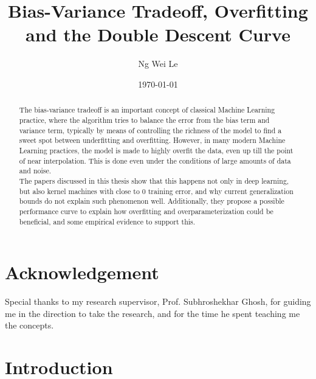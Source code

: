 \documentclass[twoside]{memoir}
\title{Bias-Variance Tradeoff, Overfitting and the Double Descent Curve}
\author{Ng Wei Le}
\date{\today}
\begin{document}
	\frontmatter
	
	
\maketitle

\chapter{Acknowledgement}
Special thanks to my research supervisor, Prof. Subhroshekhar Ghosh, for guiding me in the direction to take the research, and for the time he spent teaching me the concepts.
	
\begin{abstract}
	The bias-variance tradeoff is an important concept of classical Machine Learning practice, where the algorithm tries to balance the error from the bias term and variance term, typically by means of controlling the richness of the model to find a sweet spot between underfitting and overfitting. However, in many modern Machine Learning practices, the model is made to highly overfit the data, even up till the point of near interpolation. This is done even under the conditions of large amounts of data and noise.\\
	The papers discussed in this thesis show that this happens not only in deep learning, but also kernel machines with close to 0 training error, and why current generalization bounds do not explain such phenomenon well. Additionally, they propose a possible performance curve to explain how overfitting and overparameterization could be beneficial, and some empirical evidence to support this.
\end{abstract}
	
\tableofcontents

\listoffigures*

\mainmatter

\chapter{Introduction}
\end{document}
